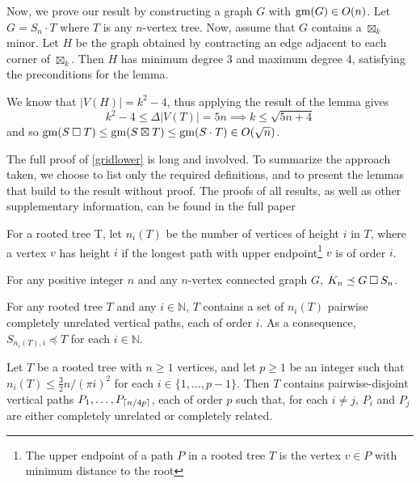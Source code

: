 \documentclass[../main.tex]{subfiles}
\begin{document}
	Now, we prove our result by constructing a graph $G$ with $\operatorname{gm}(G) \in O(n)$. Let $G = S_n\cdot T$ where $T$ is any $n$-vertex tree. Now, assume that $G$ contains a $\boxtimes_k$ minor. Let $H$ be the graph obtained by contracting an edge adjacent to each corner of $\boxtimes_k$. Then $H$ has minimum degree 3 and maximum degree 4, satisfying the preconditions for the lemma. 
	
	We know that $|V(H)| = k^2 - 4$, thus applying the result of the lemma gives 
	$$k^2 - 4 \le \Delta|V(T)| = 5n \implies k \le \sqrt{5n + 4}$$ 
	and so $\operatorname{gm}(S\mathbin{\Box} T) \le \operatorname{gm}(S\boxtimes T)\le \operatorname{gm}(S\cdot T) \in O(\sqrt{n})$.
	
	The full proof of \cref{gridlower} is long and involved. To summarize the approach taken, we choose to list only the required definitions, and to present the lemmas that build to the result without proof. The proofs of all results, as well as other supplementary information, can be found in the full paper \cite{DMWW24}
	
	For a rooted tree T, let $n_i(T)$ be the number of vertices of height $i$ in $T$, where a vertex $v$ has height $i$ if the longest path with upper endpoint\footnote{The upper endpoint of a path $P$ in a rooted tree $T$ is the vertex $v\in P$ with minimum distance to the root} $v$ is of order $i$.
	
	\begin{lem}\label{anything_times_star}
		For any positive integer $n$ and any $n$-vertex connected graph $G$, $K_{n} \preceq G\mathbin{\Box} S_n$.
	\end{lem}
	
	\begin{obs}\label{same_height_unrelated}
		For any rooted tree $T$ and any $i\in\mathbb{N}$, 
		$T$ contains a set of $n_i(T)$ pairwise completely unrelated vertical paths, each of order $i$.  
		As a consequence, $S_{n_i(T),i}\preceq T$ for each $i\in\mathbb{N}$. 
	\end{obs}
	
	\begin{lem}\label{disjoint_p_paths}
		Let $T$ be a rooted tree with $n\ge 1$ vertices, and let $p\geq 1$ be an integer such that $n_i(T) \leq \frac{3}{2}n/(\pi i)^2$ for each $i\in\{1,\ldots,p-1\}$.  
		Then $T$ contains pairwise-disjoint vertical paths $P_1,\ldots,P_{\lceil n/4p\rceil}$, each of order $p$ such that, for each $i\neq j$, $P_i$ and $P_j$ are either completely unrelated or completely related.
	\end{lem}
	
\end{document}
